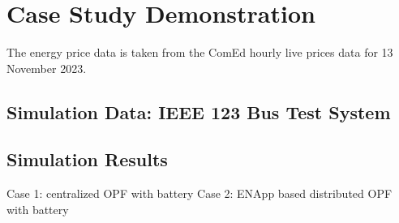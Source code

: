 \documentclass{article}
\begin{document}
\section{Case Study Demonstration}
The energy price data is taken from the ComEd hourly live prices data \cite{comedLivePrices} for 13 November 2023. 
\subsection{Simulation Data: IEEE 123 Bus Test System}

\subsection{Simulation Results}
Case 1: centralized OPF with battery
Case 2: ENApp based distributed OPF with battery
\end{document}
